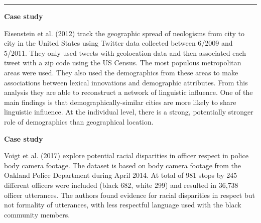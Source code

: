 \documentclass[
  letterpaper,
]{latex/krantz}
\begin{document}
\begin{center}\rule{0.5\linewidth}{0.5pt}\end{center}

\begin{tcolorbox}[enhanced jigsaw, colframe=quarto-callout-caution-color-frame, titlerule=0mm, coltitle=black, colback=white, opacitybacktitle=0.6, colbacktitle=quarto-callout-caution-color!10!white, left=2mm, arc=.35mm, leftrule=.75mm, rightrule=.15mm, bottomtitle=1mm, toptitle=1mm, breakable, bottomrule=.15mm, title=\textcolor{quarto-callout-caution-color}{\faFire}\hspace{0.5em}{Caution}, toprule=.15mm, opacityback=0]

\textbf{Case study}

Eisenstein et al. (2012) track the geographic spread of neologisms from
city to city in the United States using Twitter data collected between
6/2009 and 5/2011. They only used tweets with geolocation data and then
associated each tweet with a zip code using the US Census. The most
populous metropolitan areas were used. They also used the demographics
from these areas to make associations between lexical innovations and
demographic attributes. From this analysis they are able to reconstruct
a network of linguistic influence. One of the main findings is that
demographically-similar cities are more likely to share linguistic
influence. At the individual level, there is a strong, potentially
stronger role of demographics than geographical location.

\end{tcolorbox}

\begin{tcolorbox}[enhanced jigsaw, colframe=quarto-callout-caution-color-frame, titlerule=0mm, coltitle=black, colback=white, opacitybacktitle=0.6, colbacktitle=quarto-callout-caution-color!10!white, left=2mm, arc=.35mm, leftrule=.75mm, rightrule=.15mm, bottomtitle=1mm, toptitle=1mm, breakable, bottomrule=.15mm, title=\textcolor{quarto-callout-caution-color}{\faFire}\hspace{0.5em}{Caution}, toprule=.15mm, opacityback=0]

\textbf{Case study}

Voigt et al. (2017) explore potential racial disparities in officer
respect in police body camera footage. The dataset is based on body
camera footage from the Oakland Police Department during April 2014. At
total of 981 stops by 245 different officers were included (black 682,
white 299) and resulted in 36,738 officer utterances. The authors found
evidence for racial disparities in respect but not formality of
utterances, with less respectful language used with the black community
members.

\end{tcolorbox}
\end{document}
